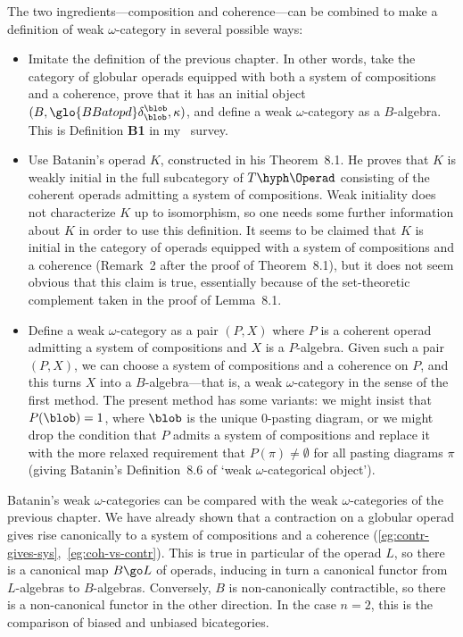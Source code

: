 The two ingredients---composition and coherence---can be combined to make a
definition of weak $\omega$-category in several possible ways:
%
\begin{itemize}
\item
Imitate the definition of the previous chapter.  In other words, take the
category of globular operads equipped with both a system of compositions
and a coherence, prove that it has an initial object $(B,%
% 
\glo{BBatopd}
% 
\delta^\blob_\blob, \kappa)$, and define a weak $\omega$-category as a
$B$-algebra.  This is Definition \textbf{B1} in my~\cite{SDN} survey.
% 
\item
Use Batanin's operad $K$, constructed in his Theorem~8.1.  He proves that
$K$ is weakly initial in the full subcategory of $T\hyph\Operad$ consisting
of the coherent operads admitting a system of compositions.  Weak
initiality does not characterize $K$ up to isomorphism, so one needs some
further information about $K$ in order to use this definition.  It seems to
be claimed that $K$ is initial in the category of operads equipped with a
system of compositions and a coherence (Remark~2 after the proof of
Theorem~8.1), but it does not seem obvious that this claim is true,
essentially because of the set-theoretic complement taken in the proof of
Lemma~8.1.
%
\item 
Define a weak $\omega$-category as a pair $(P, X)$ where $P$ is a coherent
operad admitting a system of compositions and $X$ is a $P$-algebra.  Given
such a pair $(P, X)$, we can choose a system of compositions and a
coherence on $P$, and this turns $X$ into a $B$-algebra---that is, a weak
$\omega$-category in the sense of the first method.  The present method has
some variants: we might insist that $P(\blob) = 1$, where $\blob$ is the
unique $0$-pasting diagram, or we might drop the condition that $P$ admits
a system of compositions and replace it with the more relaxed requirement
that $P(\pi) \neq \emptyset$ for all pasting diagrams $\pi$ (giving
Batanin's Definition~8.6 of `weak $\omega$-categorical object').
\end{itemize}

Batanin's weak $\omega$-categories can be compared with the weak
$\omega$-categories of the previous chapter.  We have already shown that a
contraction on a globular operad gives rise canonically to a system of
compositions and a coherence
(\ref{eg:contr-gives-sys},~\ref{eg:coh-vs-contr}).  This is true in
particular of the operad $L$, so there is a canonical map $B \go L$ of
operads, inducing in turn a canonical functor from $L$-algebras to
$B$-algebras.  Conversely, $B$ is non-canonically contractible, so there is
a non-canonical functor in the other direction.  In the case $n=2$, this
is the comparison of biased and unbiased bicategories.%
%
%
%
%


